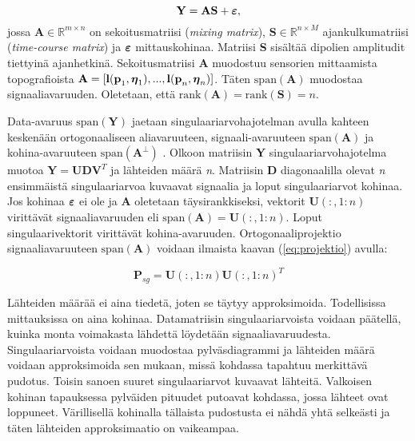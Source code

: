 \begin{equation}
    \mathbf{Y=AS+\text{\boldmath$\varepsilon$}},
\end{equation}
jossa $\mathbf{A}\in \mathbb{R}^{m\times n}$ on sekoitusmatriisi (\textit{mixing matrix}), $\mathbf{S}\in \mathbb{R}^{n\times M}$ ajankulkumatriisi (\textit{time-course matrix}) ja $\text{\boldmath$\varepsilon$}$ mittauskohinaa. Matriisi \textbf{S} sisältää dipolien amplitudit tiettyinä ajanhetkinä. Sekoitusmatriisi \textbf{A} muodostuu sensorien mittaamista topografioista $\mathbf{A} = [\mathbf{l(p}_1,\text{\boldmath$\eta$}_1),...,\mathbf{l(p}_n,\text{\boldmath$\eta$}_n)]$. Täten $\text{span}(\mathbf{A})$ muodostaa signaaliavaruuden. Oletetaan, että $\text{rank}(\mathbf{A}) = \text{rank}(\mathbf{S}) = n$.

Data-avaruus $\text{span}(\mathbf{Y})$ jaetaan singulaariarvohajotelman avulla kahteen keskenään ortogonaaliseen aliavaruuteen, signaali-avaruuteen $\text{span}(\mathbf{A})$  ja kohina-avaruuteen $\text{span}(\mathbf{A^\bot})$ \citep{Mosher1999SourceMUSIC}. Olkoon matriisin \textbf{Y} singulaariarvohajotelma muotoa $\mathbf{Y = UDV}^T$ ja lähteiden määrä \textit{n}. Matriisin \textbf{D} diagonaalilla olevat \textit{n} ensimmäistä singulaariarvoa kuvaavat signaalia ja loput singulaariarvot kohinaa. Jos kohinaa $\text{\boldmath$\varepsilon$}$ ei ole ja $\mathbf{A}$ oletetaan täysirankkiseksi, vektorit $\mathbf{U}(:,1:n)$ virittävät signaaliavaruuden eli $\text{span}(\mathbf{A}) = \mathbf{U}(:,1:n)$. Loput singulaarivektorit virittävät kohina-avaruuden. \citep{Mosher1999SourceMUSIC, Makela2018TruncatedLocalization} Ortogonaaliprojektio signaaliavaruuteen $\text{span}(\mathbf{A})$ voidaan ilmaista kaavan (\ref{eq:projektio}) avulla:

\begin{equation}
    \mathbf{P}_{sg}=\mathbf{U}(:,1:n)\mathbf{U}(:,1:n)^T
\end{equation} \citep{Makela2018TruncatedLocalization}

Lähteiden määrää ei aina tiedetä, joten se täytyy approksimoida. Todellisissa mittauksissa on aina kohinaa. Datamatriisin singulaariarvoista voidaan päätellä, kuinka monta voimakasta lähdettä löydetään signaaliavaruudesta. Singulaariarvoista voidaan muodostaa pylväsdiagrammi ja lähteiden määrä voidaan approksimoida sen mukaan, missä kohdassa tapahtuu merkittävä pudotus. Toisin sanoen suuret singulaariarvot kuvaavat lähteitä. Valkoisen kohinan tapauksessa pylväiden pituudet putoavat kohdassa, jossa lähteet ovat loppuneet. Värillisellä kohinalla tällaista pudostusta ei nähdä yhtä selkeästi ja täten lähteiden approksimaatio on vaikeampaa.

